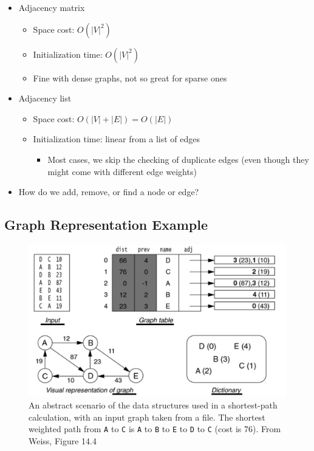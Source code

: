 \documentclass[
  10pt,
  english,
  letterpaper,
,tablecaptionabove
]{scrartcl}
\newcommand{\passthrough}[1]{#1}
\providecommand{\tightlist}{%
  \setlength{\itemsep}{0pt}\setlength{\parskip}{0pt}}
\begin{document}
\begin{itemize}
\tightlist
\item
  Adjacency matrix

  \begin{itemize}
  \tightlist
  \item
    Space cost: \(O(|V|^2)\)
  \item
    Initialization time: \(O(|V|^2)\)
  \item
    Fine with dense graphs, not so great for sparse ones
  \end{itemize}
\item
  Adjacency list

  \begin{itemize}
  \tightlist
  \item
    Space cost: \(O(|V| + |E|) = O(|E|)\)
  \item
    Initialization time: linear from a list of edges

    \begin{itemize}
    \tightlist
    \item
      Most cases, we skip the checking of duplicate edges (even though
      they might come with different edge weights)
    \end{itemize}
  \end{itemize}
\item
  How do we add, remove, or find a node or edge?
\end{itemize}

\hypertarget{graph-representation-example}{%
\subsection{Graph Representation
Example}\label{graph-representation-example}}

\begin{figure}
\centering
\includegraphics{images/2.png}
\caption{An abstract scenario of the data structures used in a
shortest-path calculation, with an input graph taken from a file. The
shortest weighted path from \passthrough{\lstinline!A!} to
\passthrough{\lstinline!C!} is \passthrough{\lstinline!A!} to
\passthrough{\lstinline!B!} to \passthrough{\lstinline!E!} to
\passthrough{\lstinline!D!} to \passthrough{\lstinline!C!} (cost is 76).
From Weiss, Figure 14.4}
\end{figure}
\end{document}
